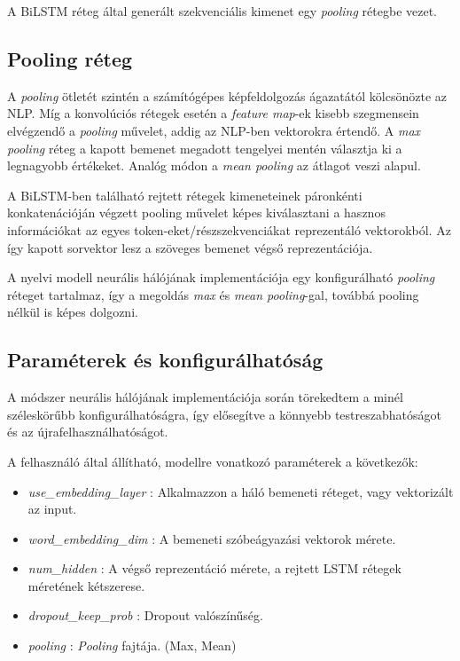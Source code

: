 A BiLSTM réteg által generált szekvenciális kimenet egy \textit{pooling} rétegbe vezet.

\subsection{Pooling réteg}

A \textit{pooling} ötletét szintén a számítógépes képfeldolgozás ágazatától kölcsönözte az NLP. Míg a konvolúciós rétegek esetén a \textit{feature map}-ek kisebb szegmensein elvégzendő a \textit{pooling} művelet, addig az NLP-ben vektorokra értendő.
A \textit{max pooling} réteg a kapott bemenet megadott tengelyei mentén választja ki a legnagyobb értékeket. Analóg módon a \textit{mean pooling} az átlagot veszi alapul.

A BiLSTM-ben található rejtett rétegek kimeneteinek páronkénti konkatenációján végzett pooling művelet képes kiválasztani a hasznos információkat az egyes token-eket/részszekvenciákat reprezentáló vektorokból. Az így kapott sorvektor lesz a szöveges bemenet végső reprezentációja.

A nyelvi modell neurális hálójának implementációja egy konfigurálható \textit{pooling} réteget tartalmaz, így a megoldás \textit{max} és \textit{mean pooling}-gal, továbbá pooling nélkül is képes dolgozni.

\subsection{Paraméterek és konfigurálhatóság}

A módszer neurális hálójának implementációja során törekedtem a minél széleskörűbb konfigurálhatóságra, így elősegítve a könnyebb testreszabhatóságot és az újrafelhasználhatóságot. 

A felhasználó által állítható, modellre vonatkozó paraméterek a következők:
\begin{itemize}
	\item \textit{use\_embedding\_layer} : Alkalmazzon a háló bemeneti réteget, vagy vektorizált az input.
	\item \textit{word\_embedding\_dim} : A bemeneti szóbeágyazási vektorok mérete.
	\item \textit{num\_hidden} : A végső reprezentáció mérete, a rejtett LSTM rétegek méretének kétszerese.
	\item \textit{dropout\_keep\_prob} : Dropout valószínűség.
	\item \textit{pooling} : \textit{Pooling} fajtája. (Max, Mean)	
\end{itemize}

